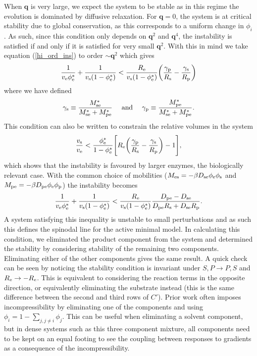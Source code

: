 When $\bm{q}$ is very large, we expect the system to be stable as in this regime the evolution is dominated by diffusive relaxation. For $\bm{q} = 0$, the system is at critical stability due to global conservation, as this corresponds to a uniform change in $\phi_i$. As such, since this condition only depends on $\bm{q}^2$ and $\bm{q}^4$, the instability is satisfied if and only if it is satisfied for very small $\bm{q}^2$. With this in mind we take equation (\ref{hi_ord_ins}) to order $\sim\bm{q}^2$ which gives
\begin{align}
    \frac{1}{v_{\mathrm{e}}\phi_{\mathrm{e}}^*}+\frac{1}{v_{\mathrm{s}}(1-\phi_{\mathrm{e}}^*)} < \frac{R_\mathrm{e} }{v_{\mathrm{s}}(1-\phi_{\mathrm{e}}^*)}\bigg(\frac{\gamma_\mathrm{p}}{R_\mathrm{s} }-\frac{\gamma_\mathrm{s}}{R_\mathrm{p} }\bigg)
    \label{2-eq_form_cond}
\end{align}
where we have defined
\begin{equation}
    \gamma_\mathrm{s} \equiv \frac{M_{\mathrm{se}}^*}{M_{\mathrm{se}}^*+M_{\mathrm{pe}}^*} \quad \text{   and    } \quad \gamma_\mathrm{p} \equiv \frac{M_{\mathrm{pe}}^*}{M_{\mathrm{se}}^*+M_{\mathrm{pe}}^*}.
\end{equation}
This condition can also be written to constrain the relative volumes in the system
\begin{equation}
    \frac{v_{\mathrm{s}}}{v_{\mathrm{e}}} < \frac{\phi_{\mathrm{e}}^*}{1-\phi_{\mathrm{e}}^*}\Bigg[R_\mathrm{e} \bigg(\frac{\gamma_\mathrm{p}}{R_\mathrm{s} }-\frac{\gamma_\mathrm{s}}{R_\mathrm{p} }\bigg) - 1\Bigg],
    \label{vol_ins}
\end{equation}
which shows that the instability is favoured by larger enzymes, the biologically relevant case. With the common choice of mobilities ($M_{\mathrm{es}} = -\beta D_{\mathrm{se}}\phi_{\mathrm{e}}\phi_{\mathrm{s}}$ and $M_{\mathrm{pe}} = -\beta D_{\mathrm{pe}}\phi_{\mathrm{e}}\phi_{\mathrm{p}}$) the instability becomes
\begin{equation}
    \frac{1}{v_{\mathrm{e}}\phi_{\mathrm{e}}^*}+\frac{1}{v_{\mathrm{s}}(1-\phi_{\mathrm{e}}^*)} < \frac{R_\mathrm{e} }{v_{\mathrm{s}}(1-\phi_{\mathrm{e}}^*)}\frac{D_{\mathrm{pe}}-D_{\mathrm{se}}}{D_{\mathrm{pe}}R_\mathrm{s} +D_{\mathrm{se}}R_\mathrm{p} }. \label{eq:2-inst}
\end{equation}
A system satisfying this inequality is unstable to small perturbations and as such this defines the spinodal line for the active minimal model. In calculating this condition, we eliminated the product component from the system and determined the stability by considering stability of the remaining two components. Eliminating either of the other components gives the same result. A quick check can be seen by noticing the stability condition is invariant under $S, P \rightarrow P, S$ and $R_\mathrm{e} \rightarrow -R_\mathrm{e}$. This is equivalent to considering the reaction terms in the opposite direction, or equivalently eliminating the substrate instead (this is the same difference between the second and third rows of $C'$). Prior work often imposes incompressibility by eliminating one of the components and using $\phi_i = 1-\sum_{j,j\neq i}\phi_j$. This can be useful when eliminating a solvent component, but in dense systems such as this three component mixture, all components need to be kept on an equal footing to see the coupling between responses to gradients as a consequence of the incompressibility.

